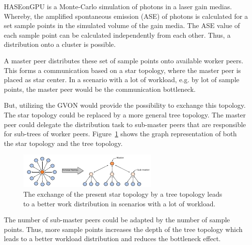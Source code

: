 HASEonGPU is a Monte-Carlo simulation of photons in a laser gain
medias. Whereby, the amplified spontaneous emission (ASE) of photons
is calculated for a set sample points in the simulated volume of
the gain media. The ASE value of each sample point can be calculated
independently from each other. Thus, a distribution onto a cluster
is possible.

A master peer distributes these set of sample points onto
available worker peers. This forms a communication based on a
star topology, where the master peer is placed as star center. In a
scenario with a lot of workload, e.g. by lot of sample points, the
master peer would be the communication bottleneck.

But, utilizing the GVON would provide the possibility to exchange this
topology. The star topology could be replaced by a more general tree
topology. The master peer could delegate the distribution task to
sub-master peers that are responsible for sub-trees of worker peers.
Figure~\ref{fig:haseongpu_topology} shows the graph representation of
both the star topology and the tree topology. 

\begin{figure}[H]
  \centering \includegraphics[width=\textwidth]{graphics/60_haseongpu_topology}
  \caption{The exchange of the present star topology by a tree topology
  leads to a better work distribution in scenarios with a lot of workload.}
  \label{fig:haseongpu_topology}
\end{figure}

\noindent The number of sub-master peers could be adapted by the
number of sample points.  Thus, more sample points increases the depth
of the tree topology which leads to a better workload distribution and
reduces the bottleneck effect.


